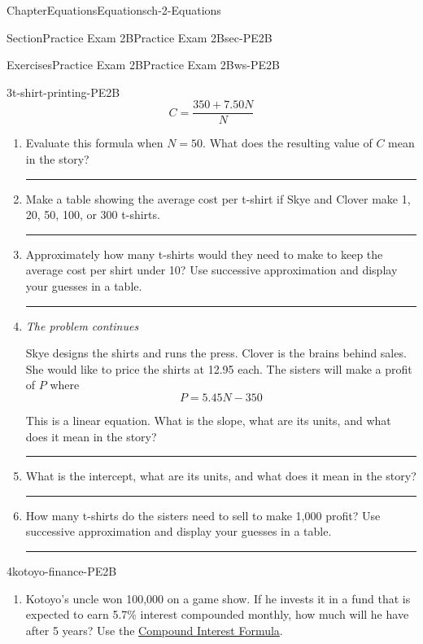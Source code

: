 \documentclass[twoside,11pt,]{book}
\newlength{\workspacestrutwidth}
\numberwithin{equation}{section}
\begin{document}
\begin{chapterptx}{Chapter}{Equations}{}{Equations}{}{}{ch-2-Equations}
\begin{sectionptx}{Section}{Practice Exam 2B}{}{Practice Exam 2B}{}{}{sec-PE2B}
\begin{exercises-subsection-numberless}{Exercises}{Practice Exam 2B}{}{Practice Exam 2B}{}{}{ws-PE2B}
\begin{divisionexercise}{3}{}{}{t-shirt-printing-PE2B}
\begin{equation*}
C = \frac{350+7.50N}{N}
\end{equation*}
%
\begin{enumerate}[label=(\alph*),ref=\alph*]%
\item{}Evaluate this formula when \(N=50\). What does the resulting value of \(C\) mean in the story?%
\par\rule{\workspacestrutwidth}{1.5in}%
\item{}Make a table showing the average cost per t-shirt if Skye and Clover make 1, 20, 50, 100, or 300 t-shirts.%
\par\rule{\workspacestrutwidth}{1.5in}%
\item{}Approximately how many t-shirts would they need to make to keep the average cost per shirt under \textdollar{}10? Use successive approximation and display your guesses in a table.%
\par\rule{\workspacestrutwidth}{2.5in}%
\item{}\emph{The problem continues \textellipsis{}}%
\par
Skye designs the shirts and runs the press. Clover is the brains behind sales. She would like to price the shirts at \textdollar{}12.95 each. The sisters will make a profit of \textdollar{}\(P\) where%
\begin{equation*}
P = 5.45N-350
\end{equation*}
%
\par
This is a linear equation. What is the slope, what are its units, and what does it mean in the story?%
\par\rule{\workspacestrutwidth}{1.5in}%
\item{}What is the intercept, what are its units, and what does it mean in the story?%
\par\rule{\workspacestrutwidth}{1.5in}%
\item{}How many t-shirts do the sisters need to sell to make \textdollar{}1,000 profit? Use successive approximation and display your guesses in a table.%
\par\rule{\workspacestrutwidth}{1.5in}%
\end{enumerate}%
\end{divisionexercise}%
\clearpage
 \begin{divisionexercise}{4}{}{}{kotoyo-finance-PE2B}%
\vspace{-\baselineskip-\parsep}%
\begin{enumerate}[label=(\alph*),ref=\alph*]%
\item{}Kotoyo's uncle won \textdollar{}100,000 on a game show. If he invests it in a fund that is expected to earn 5.7\% interest compounded monthly, how much will he have after 5 years? Use the \hyperref[compound-interest-formula]{Compound Interest Formula}.%

\end{enumerate}
\end{divisionexercise}
\end{exercises-subsection-numberless}
\end{sectionptx}
\end{chapterptx}
\end{document}
